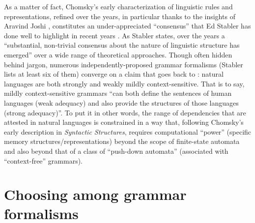 As a matter of fact, Chomsky's early characterization of linguistic rules and representations, refined over the years, in particular thanks to the insights of Aravind Joshi \citep{joshi1985tree}, constitutes an under-appreciated ``consensus'' that Ed Stabler has done well to highlight in recent years \citep{stabler2011computational,stabler2013epicenter}. As Stabler states, over the years a ``substantial, non-trivial consensus about the nature of linguistic structure has emerged'' over a wide range of theoretical approaches. Though often hidden behind jargon, numerous  independently-proposed grammar formalisms (Stabler lists at least six of them) converge on a claim that goes back to \cite{joshi1985tree}: natural languages are both strongly and weakly mildly context-sensitive. That is to say, mildly context-sensitive grammars ``can both define the sentences of human languages (weak adequacy) and also provide the structures of those languages (strong adequacy)''. To put it in other words, the range of dependencies that are attested in natural languages is constrained in a way that, following Chomsky's early description in \textit{Syntactic Structures}, requires computational ``power'' (specific memory structures/representations) beyond the scope of finite-state automata and also beyond that of a class of ``push-down automata'' (associated with ``context-free'' grammars).

\section{Choosing among grammar formalisms}

